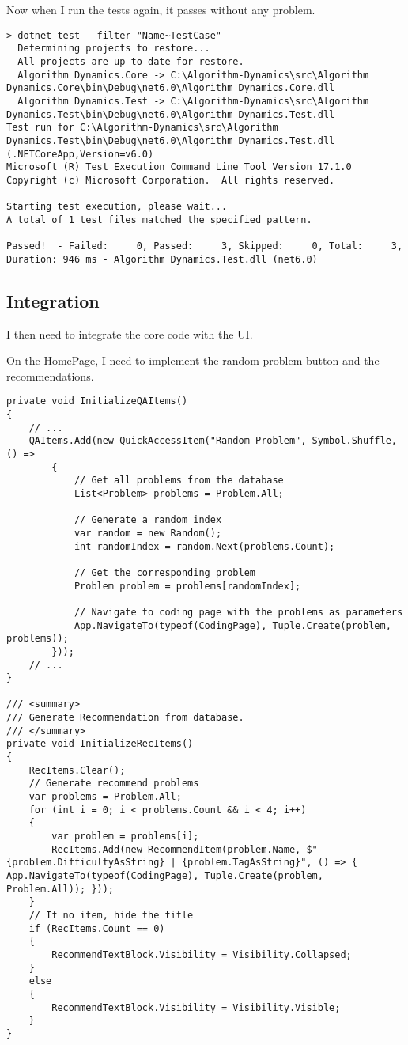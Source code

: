 \documentclass[report.tex]{subfiles}
\begin{document}
Now when I run the tests again, it passes without any problem.

\begin{verbatim}
> dotnet test --filter "Name~TestCase"
  Determining projects to restore...
  All projects are up-to-date for restore.
  Algorithm Dynamics.Core -> C:\Algorithm-Dynamics\src\Algorithm Dynamics.Core\bin\Debug\net6.0\Algorithm Dynamics.Core.dll
  Algorithm Dynamics.Test -> C:\Algorithm-Dynamics\src\Algorithm Dynamics.Test\bin\Debug\net6.0\Algorithm Dynamics.Test.dll
Test run for C:\Algorithm-Dynamics\src\Algorithm Dynamics.Test\bin\Debug\net6.0\Algorithm Dynamics.Test.dll (.NETCoreApp,Version=v6.0)
Microsoft (R) Test Execution Command Line Tool Version 17.1.0
Copyright (c) Microsoft Corporation.  All rights reserved.

Starting test execution, please wait...
A total of 1 test files matched the specified pattern.

Passed!  - Failed:     0, Passed:     3, Skipped:     0, Total:     3, Duration: 946 ms - Algorithm Dynamics.Test.dll (net6.0)
\end{verbatim}



\subsection{Integration}

I then need to integrate the core code with the UI.

On the HomePage, I need to implement the random problem button and the recommendations.

\begin{verbatim}
private void InitializeQAItems()
{
    // ...    
    QAItems.Add(new QuickAccessItem("Random Problem", Symbol.Shuffle, () =>
        {
            // Get all problems from the database
            List<Problem> problems = Problem.All;

            // Generate a random index
            var random = new Random();
            int randomIndex = random.Next(problems.Count);

            // Get the corresponding problem
            Problem problem = problems[randomIndex];

            // Navigate to coding page with the problems as parameters
            App.NavigateTo(typeof(CodingPage), Tuple.Create(problem, problems));
        }));
    // ...
}

/// <summary>
/// Generate Recommendation from database.
/// </summary>
private void InitializeRecItems()
{
    RecItems.Clear();
    // Generate recommend problems
    var problems = Problem.All;
    for (int i = 0; i < problems.Count && i < 4; i++)
    {
        var problem = problems[i];
        RecItems.Add(new RecommendItem(problem.Name, $"{problem.DifficultyAsString} | {problem.TagAsString}", () => { App.NavigateTo(typeof(CodingPage), Tuple.Create(problem, Problem.All)); }));
    }
    // If no item, hide the title
    if (RecItems.Count == 0)
    {
        RecommendTextBlock.Visibility = Visibility.Collapsed;
    }
    else
    {
        RecommendTextBlock.Visibility = Visibility.Visible;
    }
}
\end{verbatim}
\end{document}
